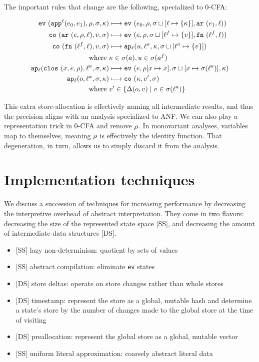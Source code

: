 \documentclass[preprint,onecolumn,9pt]{sigplanconf} %
\begin{document}
The important rules that change are the following, specialized to 0-CFA:

\begin{align*}
\ev{\sapp[^\mlab]{\mexpi0}{\mexpi1},\menv,\msto,\mkont} &\machstep
\ev{\mexpi{0},\menv,\msto\sqcup[\mlab \mapsto \{\mkont\}],\kar{\mexpi{1},\mlab}}
\\
\co{\kar{\mexp,\menv,\mlab},\mval,\msto} & \machstep
\ev{\mexp,\menv,\msto\sqcup[\mlab^f \mapsto \{\mval\}],\kfn{\mlab^f,\mlab}}
\\
\co{\kfn{\mlab^f,\mlab},\mval,\msto} & \machstep
\ap[_\mlab]{\mvalx{u},\mlab^a,\mkont,\msto\sqcup[\mlab^a \mapsto \{\mval\}]}
\\
\text{ where } &\mkont \in \msto(\maddr), \mvalx{u} \in \msto(\maddr^f)
\\
\ap[_\mlab]{\clos{\mvar,\mexp,\menv},\mlab^a, \msto,\mkont} & \machstep
\ev{\mexp,\menv[\mvar\mapsto\mvar],\msto\sqcup[\mvar \mapsto \msto(\mlab^a)],\mkont}
\\
\ap[_\mlab]{\mop,\mlab^a,\msto,\mkont} & \machstep
\co{\mkont,\mval',\msto}
\\
\text{ where }& \mval'\in \{\interpdelta(\mop,\mval) \mid \mval \in \msto(\mlab^a)\}
\end{align*}

This extra store-allocation is effectively naming all intermediate
results, and thus the precision aligns with an analysis specialized to
ANF. We can also play a representation trick in 0-CFA and remove
$\menv$. In monovariant analyses, variables map to themselves, meaning
$\menv$ is effectively the identity function. That degeneration, in
turn, allows us to simply discard it from the analysis.


\section{Implementation techniques}
\label{sec:opt}

We discuss a succession of techniques for increasing performance by
decreasing the interpretive overhead of abstract interpretation. They
come in two flavors: decreasing the size of the represented state
space [SS], and decreasing the amount of intermediate data structures [DS].

\begin{itemize}
 \item{[SS] lazy non-determinism: quotient by sets of values}
 \item{[SS] abstract compilation: eliminate {\tt ev} states}
 \item{[DS] store deltas: operate on store changes rather than whole stores}
 \item{[DS] timestamp: represent the store as a global, mutable hash and
   determine a state's store by the number of changes made to the
   global store at the time of visiting}
 \item{[DS] preallocation: represent the global store as a global, mutable vector}
 \item{[SS] uniform literal approximation: coarsely abstract literal data}
\end{itemize}
\end{document}

